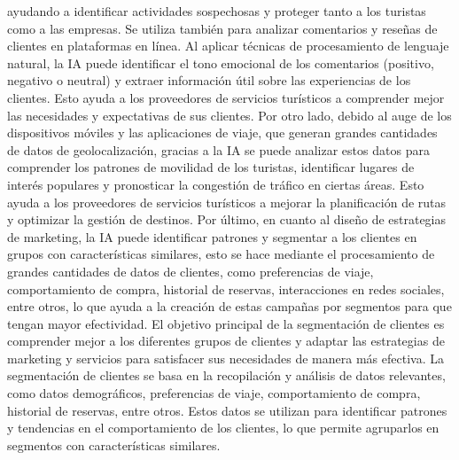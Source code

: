 \documentclass[
  letterpaper,
  DIV=11,
  numbers=noendperiod]{scrreprt}
\begin{document}
ayudando a identificar actividades sospechosas y proteger tanto a los
turistas como a las empresas. Se utiliza también para analizar
comentarios y reseñas de clientes en plataformas en línea. Al aplicar
técnicas de procesamiento de lenguaje natural, la IA puede identificar
el tono emocional de los comentarios (positivo, negativo o neutral) y
extraer información útil sobre las experiencias de los clientes. Esto
ayuda a los proveedores de servicios turísticos a comprender mejor las
necesidades y expectativas de sus clientes. Por otro lado, debido al
auge de los dispositivos móviles y las aplicaciones de viaje, que
generan grandes cantidades de datos de geolocalización, gracias a la IA
se puede analizar estos datos para comprender los patrones de movilidad
de los turistas, identificar lugares de interés populares y pronosticar
la congestión de tráfico en ciertas áreas. Esto ayuda a los proveedores
de servicios turísticos a mejorar la planificación de rutas y optimizar
la gestión de destinos. Por último, en cuanto al diseño de estrategias
de marketing, la IA puede identificar patrones y segmentar a los
clientes en grupos con características similares, esto se hace mediante
el procesamiento de grandes cantidades de datos de clientes, como
preferencias de viaje, comportamiento de compra, historial de reservas,
interacciones en redes sociales, entre otros, lo que ayuda a la creación
de estas campañas por segmentos para que tengan mayor efectividad. El
objetivo principal de la segmentación de clientes es comprender mejor a
los diferentes grupos de clientes y adaptar las estrategias de marketing
y servicios para satisfacer sus necesidades de manera más efectiva. La
segmentación de clientes se basa en la recopilación y análisis de datos
relevantes, como datos demográficos, preferencias de viaje,
comportamiento de compra, historial de reservas, entre otros. Estos
datos se utilizan para identificar patrones y tendencias en el
comportamiento de los clientes, lo que permite agruparlos en segmentos
con características similares.
\end{document}
